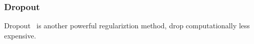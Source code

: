 \subsubsection{Dropout}

Dropout~\cite{JMLR:v15:srivastava14a} is another powerful regulariztion method, drop computationally less expensive. 